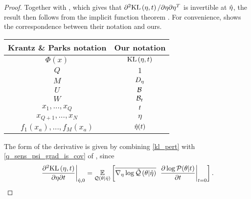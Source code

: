 \begin{proof}

Together with , which gives that $\partial^2
\mathrm{KL}\left(\eta, t\right) / \partial \eta \partial\eta^T$ is invertible at $\hat\eta$, the
result then follows from the implicit function theorem \citet[Theorem
3.3.1]{krantz:2012:implicit}. For convenience,  shows the
correspondence between their notation and ours.

\begin{center}
\begin{tabular}{|c|c|}
%
\hline Krantz \& Parks notation & Our notation \\\hline
$\Phi(x)$                       & $\mathrm{KL}\left(\eta, t\right)$ \\\hline
$Q$                             & $1$ \\\hline
$M$                             & ${D_{\eta}}$ \\\hline
$U$                             & $\mathcal{B}$ \\\hline
$W$                             & $\mathcal{B}_t$ \\\hline
$x_1,\ldots,x_Q$                & $t$ \\\hline
$x_{Q+1},\ldots,x_N$            & $\eta$ \\\hline
$f_1(x_a), \ldots,f_M(x_a)$     & $\hat\eta(t)$ \\\hline
%
\end{tabular}
\end{center}

The form of the derivative is given by combining \eqref{kl_pert} with
\eqref{q_sens_psi_grad_is_cov} of , since
%
\begin{align*}
%
\fracat{\partial^2 \KL{\eta, \t}}
       {\partial \eta \partial \t}
       {\etaopt, 0} =
\expect{\q(\theta \vert \etaopt)}{
    \lqgradbar{\theta \vert \etaopt}
    \fracat{\partial \log \p(\theta \vert \t)}{\partial \t}{\t=0}
}.
%
\end{align*}
%

%
\end{proof}
%

